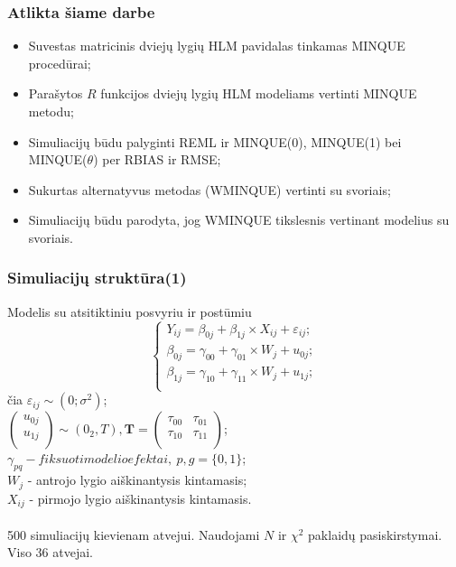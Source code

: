 \documentclass[utf8,hyperref={unicode,pdftex}]{beamer}
\begin{document}
\begin{frame}
\frametitle{Atlikta šiame darbe}
\begin{itemize}
\item Suvestas matricinis dviejų lygių HLM pavidalas tinkamas MINQUE procedūrai;
\item Parašytos $R$ funkcijos dviejų lygių HLM modeliams vertinti MINQUE metodu;
\item Simuliacijų būdu palyginti REML ir MINQUE(0), MINQUE(1) bei MINQUE($\theta$) per RBIAS ir RMSE;
\item Sukurtas alternatyvus metodas (WMINQUE) vertinti su svoriais;
\item Simuliacijų būdu parodyta, jog WMINQUE tikslesnis vertinant modelius su svoriais.
\end{itemize}
\end{frame}
\begin{frame}
\frametitle{Simuliacijų struktūra(1)}
Modelis su atsitiktiniu posvyriu ir postūmiu
\begin{equation*} \label{eq:2lvldelpish}
\left\{
\begin{array}{l}
Y_{ij} = \beta_{0j}+ \beta_{1j}\times X_{ij}+\varepsilon_{ij}; \\
\beta_{0j} = \gamma_{00} +\gamma_{01}\times W_{j}+u_{0j};\\
\beta_{1j} = \gamma_{10} +\gamma_{11}\times W_{j}+u_{1j};\\
\end{array} \right.
\end{equation*}
čia 
$\varepsilon_{ij}\sim \left(0;\sigma^2\right)$;\\
$\begin{pmatrix}
u_{0j} \\
u_{1j} \\
\end{pmatrix}\sim \left(0_2, T\right), \mathbf{T}=\begin{pmatrix}
\tau_{00} & \tau_{01} \\
\tau_{10} & \tau_{11} \\
\end{pmatrix}$; \\
$\gamma_{pq} - fiksuoti modelio efektai,\ p,g = \{0,1\}$;\\
$W_j$ - antrojo lygio aiškinantysis kintamasis;\\
$X_{ij}$ - pirmojo lygio aiškinantysis kintamasis.\\ 
\ \\
500 simuliacijų kievienam atvejui. Naudojami $N$ ir $\chi^2$ paklaidų pasiskirstymai. Viso 36 atvejai.

\end{frame}
\end{document}
